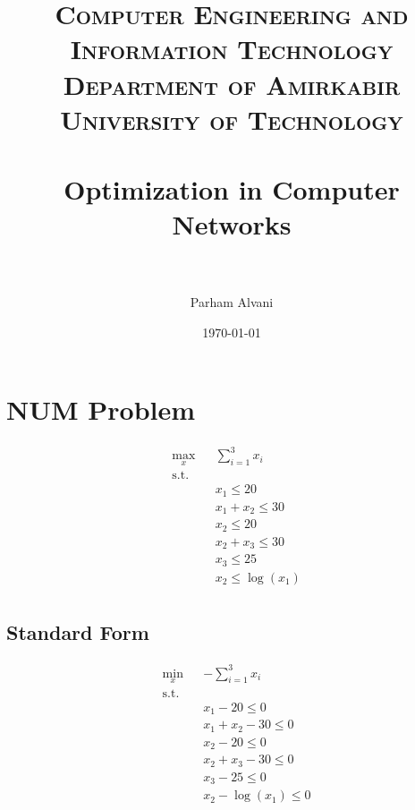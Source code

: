 \documentclass[paper=a4, fontsize=11pt]{scrartcl} %
\title{	
	\normalfont\normalsize
	\textsc{Computer Engineering and Information Technology Department of Amirkabir University of Technology} \\ [25pt] %
	\horrule{0.5pt} \\[0.4cm] %
	\huge Optimization in Computer Networks \\ %
	\horrule{2pt} \\[0.5cm] %
}
\author{Parham Alvani} %
\date{\normalsize\today} %
\numberwithin{equation}{section} %
\numberwithin{figure}{section} %
\numberwithin{table}{section} %
\begin{document}
\maketitle %


\section{NUM Problem}

\begin{equation}
	\begin{aligned}
		& \underset{x}{\text{max}}
		& & \sum_{i=1}^{3} x_i \\
		& \text{s.t.} \\
		& & & x_1 \le 20 \\
		& & & x_1 + x_2 \le 30 \\
		& & & x_2 \le 20 \\
		& & & x_2 + x_3 \le 30 \\
		& & & x_3 \le 25 \\
		& & & x_2 \le \log(x_1) \\
	\end{aligned}					
\end{equation}


\subsection{Standard Form}

\begin{equation}
	\begin{aligned}
		& \underset{x}{\text{min}}
		& & -\sum_{i=1}^{3} x_i \\
		& \text{s.t.} \\
		& & & x_1 - 20 \le 0 \\
		& & & x_1 + x_2 - 30 \le 0 \\
		& & & x_2 - 20 \le 0 \\
		& & & x_2 + x_3 - 30 \le 0 \\
		& & & x_3 - 25 \le 0 \\
		& & & x_2 - \log(x_1) \le 0 \\
	\end{aligned}					
\end{equation}
\end{document}
